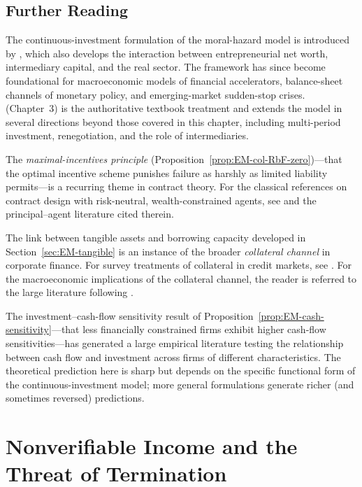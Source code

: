 \documentclass[11pt,a4paper,oneside]{book}
\theoremstyle{plain}
\theoremstyle{definition}
\theoremstyle{remark}
\numberwithin{equation}{chapter}
\begin{document}
\section{Further Reading}
\label{sec:EM-further-reading}

The continuous-investment formulation of the moral-hazard model is introduced by \citet{HolmstromTirole1997}, which also develops the interaction between entrepreneurial net worth, intermediary capital, and the real sector.
The framework has since become foundational for macroeconomic models of financial accelerators, balance-sheet channels of monetary policy, and emerging-market sudden-stop crises.
\citet{Tirole2006} (Chapter~3) is the authoritative textbook treatment and extends the model in several directions beyond those covered in this chapter, including multi-period investment, renegotiation, and the role of intermediaries.

The \emph{maximal-incentives principle} (Proposition~\ref{prop:EM-col-RbF-zero})---that the optimal incentive scheme punishes failure as harshly as limited liability permits---is a recurring theme in contract theory.
For the classical references on contract design with risk-neutral, wealth-constrained agents, see \citet{Tirole2006} and the principal--agent literature cited therein.

The link between tangible assets and borrowing capacity developed in Section~\ref{sec:EM-tangible} is an instance of the broader \emph{collateral channel} in corporate finance.
For survey treatments of collateral in credit markets, see \citet{FreixasRochet1997}.
For the macroeconomic implications of the collateral channel, the reader is referred to the large literature following \citet{HolmstromTirole1997}.

The investment--cash-flow sensitivity result of Proposition~\ref{prop:EM-cash-sensitivity}---that less financially constrained firms exhibit higher cash-flow sensitivities---has generated a large empirical literature testing the relationship between cash flow and investment across firms of different characteristics.
The theoretical prediction here is sharp but depends on the specific functional form of the continuous-investment model; more general formulations generate richer (and sometimes reversed) predictions.

\chapter{Nonverifiable Income and the Threat of Termination}
\label{ch:nonverifiable}
\end{document}
